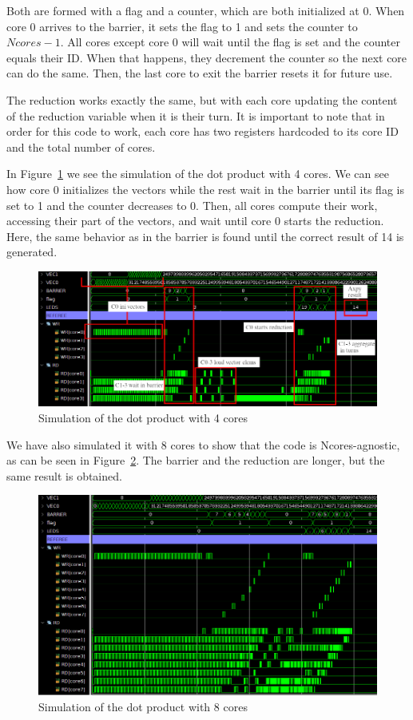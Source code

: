 Both are formed with a flag and a counter, which are both initialized at 0.
When core 0 arrives to the barrier, it sets the flag to 1 and sets the counter to $Ncores - 1$.
All cores except core 0 will wait until the flag is set and the counter equals their ID.
When that happens, they decrement the counter so the next core can do the same.
Then, the last core to exit the barrier resets it for future use.


The reduction works exactly the same, but with each core updating the content of the reduction variable when it is their turn.
It is important to note that in order for this code to work, each core has two registers hardcoded to its core ID and the total number of cores.


In Figure~\ref{4dot-sim} we see the simulation of the dot product with 4 cores.
We can see how core 0 initializes the vectors while the rest wait in the barrier until its flag is set to 1 and the counter decreases to 0.
Then, all cores compute their work, accessing their part of the vectors, and wait until core 0 starts the reduction.
Here, the same behavior as in the barrier is found until the correct result of 14 is generated.


\begin{figure}[h!]
    \centering
    \includegraphics[width=1.0\textwidth]{images/axpy_sim4_crop_arrow.png}
    \caption{Simulation of the dot product with 4 cores}
    \label{4dot-sim}
\end{figure}

We have also simulated it with 8 cores to show that the code is Ncores-agnostic, as can be seen in Figure~\ref{8dot-sim}.
The barrier and the reduction are longer, but the same result is obtained.

\newpage
\begin{figure}[h!]
    \centering
    \includegraphics[width=1.0\textwidth]{images/axpy_sim8_crop.png}
    \caption{Simulation of the dot product with 8 cores}
    \label{8dot-sim}
\end{figure}










